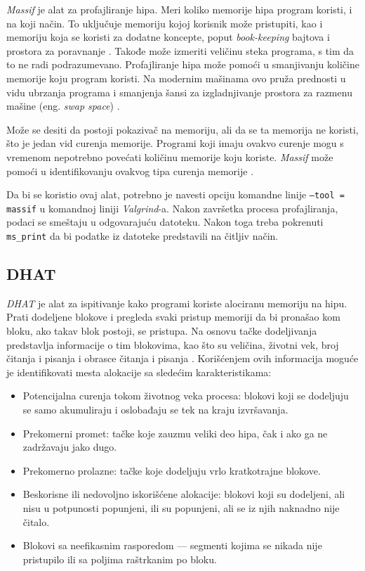 \documentclass[12pt,oneside]{memoir}
\theoremstyle{plain}
\theoremstyle{definition}
\begin{document}
\textit{Massif} je alat za profajliranje hipa. Meri koliko memorije hipa program koristi, i na koji način. To uključuje memoriju kojoj korisnik može pristupiti, kao i memoriju koja se koristi za dodatne koncepte, poput \textit{book-keeping} bajtova i prostora za poravnanje \cite{Massif}. Takođe može izmeriti veličinu steka  programa, s tim da to ne radi podrazumevano. Profajliranje hipa može pomoći u smanjivanju količine memorije koju program koristi. Na modernim mašinama ovo pruža prednosti u vidu ubrzanja programa i smanjenja šansi za izgladnjivanje prostora za razmenu mašine (eng. \textit{swap space}) \cite{Massif}.

Može se desiti da postoji pokazivač na memoriju, ali da se ta memorija ne koristi, što je jedan vid curenja memorije. Programi koji imaju ovakvo curenje mogu s vremenom nepotrebno povećati količinu memorije koju koriste. \textit{Massif} može pomoći u identifikovanju ovakvog tipa curenja memorije \cite{Massif}.

Da bi se koristio ovaj alat, potrebno je navesti opciju komandne linije \texttt{--tool = massif} u komandnoj liniji \textit{Valgrind}-a. Nakon završetka procesa profajliranja, podaci se smeštaju u odgovarajuću datoteku. Nakon toga treba pokrenuti \texttt{ms\_print} da bi podatke iz datoteke predstavili na čitljiv način. 

\subsection{DHAT}

\textit{DHAT} je alat za ispitivanje kako programi koriste alociranu memoriju na hipu. Prati dodeljene blokove i pregleda svaki pristup memoriji da bi pronašao kom bloku, ako takav blok postoji, se pristupa. Na osnovu tačke dodeljivanja predstavlja informacije o tim blokovima, kao što su veličina, životni vek, broj čitanja i pisanja i obrasce čitanja i pisanja \cite{DHAT}. Korišćenjem ovih informacija moguće je identifikovati mesta alokacije sa sledećim karakteristikama:
\begin{itemize}
\item Potencijalna curenja tokom životnog veka procesa: blokovi koji se dodeljuju se samo akumuliraju i oslobađaju se tek na kraju izvršavanja.
\item Prekomerni promet: tačke koje zauzmu veliki deo hipa, čak i ako ga ne zadržavaju jako dugo.
\item Prekomerno prolazne: tačke koje dodeljuju vrlo kratkotrajne blokove.
\item Beskorisne ili nedovoljno iskorišćene alokacije: blokovi koji su dodeljeni, ali nisu u potpunosti popunjeni, ili su popunjeni, ali se iz njih naknadno nije čitalo.
\item Blokovi sa neefikasnim rasporedom --- segmenti kojima se nikada nije pristupilo ili sa poljima raštrkanim po bloku.
\end{itemize}
\end{document}

